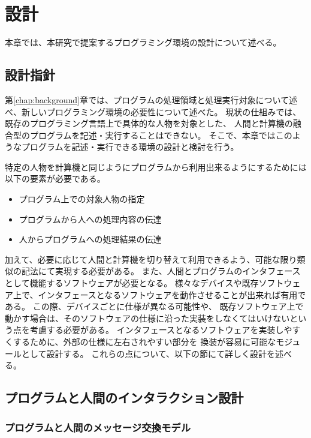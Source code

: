 \chapter{設計}\label{chap:design}

本章では、本研究で提案するプログラミング環境の設計について述べる。

\section{設計指針}\label{ux8a2dux8a08ux6307ux91dd}

第\ref{chap:background}章では、プログラムの処理領域と処理実行対象について述べ、新しいプログラミング環境の必要性について述べた。
現状の仕組みでは、既存のプログラミング言語上で具体的な人物を対象とした、
人間と計算機の融合型のプログラムを記述・実行することはできない。
そこで、本章ではこのようなプログラムを記述・実行できる環境の設計と検討を行う。

特定の人物を計算機と同じようにプログラムから利用出来るようにするためには以下の要素が必要である。

\begin{itemize}
\itemsep1pt\parskip0pt
\item
  プログラム上での対象人物の指定
\item
  プログラムから人への処理内容の伝達
\item
  人からプログラムへの処理結果の伝達
\end{itemize}

加えて、必要に応じて人間と計算機を切り替えて利用できるよう、可能な限り類似の記法にて実現する必要がある。
また、人間とプログラムのインタフェースとして機能するソフトウェアが必要となる。
様々なデバイスや既存ソフトウェア上で、インタフェースとなるソフトウェアを動作させることが出来れば有用である。
この際、デバイスごとに仕様が異なる可能性や、
既存ソフトウェア上で動かす場合は、そのソフトウェアの仕様に沿った実装をしなくてはいけないという点を考慮する必要がある。
インタフェースとなるソフトウェアを実装しやすくするために、外部の仕様に左右されやすい部分を
換装が容易に可能なモジュールとして設計する。
これらの点について、以下の節にて詳しく設計を述べる。

\section{プログラムと人間のインタラクション設計}\label{sec:program-human-interaction-design}

\subsection{プログラムと人間のメッセージ交換モデル}\label{ux30d7ux30edux30b0ux30e9ux30e0ux3068ux4ebaux9593ux306eux30e1ux30c3ux30bbux30fcux30b8ux4ea4ux63dbux30e2ux30c7ux30eb}

